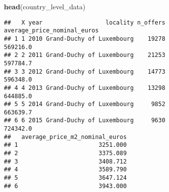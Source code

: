 \documentclass[
]{article}
\newenvironment{Shaded}{\begin{snugshade}}{\end{snugshade}}
\newcommand{\FunctionTok}[1]{\textcolor[rgb]{0.13,0.29,0.53}{\textbf{#1}}}
\newcommand{\NormalTok}[1]{#1}
\begin{document}
\begin{Shaded}
\begin{Highlighting}[]
\FunctionTok{head}\NormalTok{(country\_level\_data)}
\end{Highlighting}
\end{Shaded}

\begin{verbatim}
##   X year                  locality n_offers average_price_nominal_euros
## 1 1 2010 Grand-Duchy of Luxembourg    19278                    569216.0
## 2 2 2011 Grand-Duchy of Luxembourg    21253                    597784.7
## 3 3 2012 Grand-Duchy of Luxembourg    14773                    596348.0
## 4 4 2013 Grand-Duchy of Luxembourg    13298                    644885.0
## 5 5 2014 Grand-Duchy of Luxembourg     9852                    663639.7
## 6 6 2015 Grand-Duchy of Luxembourg     9630                    724342.0
##   average_price_m2_nominal_euros
## 1                       3251.000
## 2                       3375.089
## 3                       3408.712
## 4                       3589.790
## 5                       3647.124
## 6                       3943.000
\end{verbatim}
\end{document}
